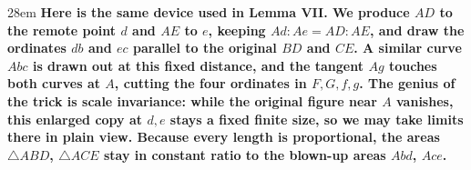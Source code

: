 \documentclass[border=4pt]{standalone}
\begin{document}
\begin{varwidth}{28em}
\large\bfseries
Here is the same device used in Lemma VII. We produce $AD$ to the remote point      $d$ and $AE$ to $e$, keeping $Ad : Ae = AD : AE$, and draw the ordinates $db$ and $ec$      parallel to the original $BD$ and $CE$. A similar curve $Abc$ is drawn out at      this fixed distance, and the tangent $Ag$ touches both curves at $A$, cutting      the four ordinates in $F, G, f, g$. The genius of the trick is scale invariance: while the      original figure near $A$ vanishes, this enlarged copy at $d, e$ stays a fixed finite size,      so we may take limits there in plain view. Because every length is proportional, the areas      $\triangle ABD$, $\triangle ACE$ stay in constant ratio to the blown-up areas $Abd$, $Ace$.
\end{varwidth}
\end{document}
